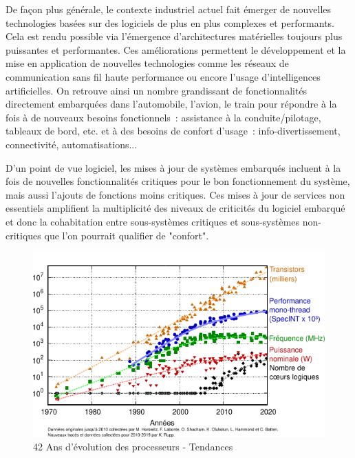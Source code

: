 \documentclass[french, a4paper, 11pt, twoside, pdftex]{StyleThese}
\begin{document}
		De façon plus générale, le contexte industriel actuel fait émerger de nouvelles technologies basées sur des logiciels de plus en plus complexes et performants. Cela est rendu possible via l'émergence d'architectures matérielles toujours plus puissantes et performantes. Ces améliorations permettent le développement et la mise en application de nouvelles technologies comme les réseaux de communication sans fil haute performance ou encore l'usage d'intelligences artificielles. On retrouve ainsi un nombre grandissant de fonctionnalités directement embarquées dans l'automobile, l'avion, le train pour répondre à la fois à de nouveaux besoins fonctionnels~: assistance à la conduite/pilotage, tableaux de bord, etc. et à des besoins de confort d'usage~: info-divertissement, connectivité, automatisations... 
		
		
		D'un point de vue logiciel, les mises à jour de systèmes embarqués incluent à la fois de nouvelles fonctionnalités critiques pour le bon fonctionnement du système, mais aussi l'ajouts de fonctions moins critiques. Ces mises à jour de services non essentiels amplifient  la multiplicité des niveaux de criticités du logiciel embarqué et donc la cohabitation entre sous-systèmes critiques et sous-systèmes non-critiques que l'on pourrait qualifier de "confort". 
		
		\begin{figure}[ht]
			\centering
			\includegraphics[width=0.8\linewidth]{graphiques/processors_trend}
			\caption[Évolution des processeurs]{42 Ans d'évolution des processeurs - Tendances}
			\label{fig:processorstrend}
		\end{figure}
		
\end{document}
